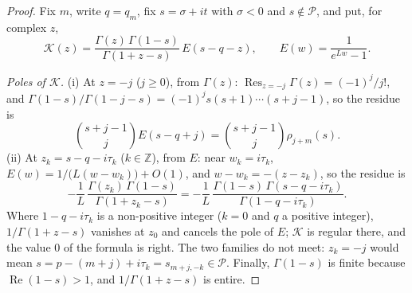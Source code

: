 \documentclass[11pt]{article}
\newcommand{\re}{\operatorname{Re}}
\newcommand{\Res}{\operatorname{Res}}
\begin{document}
\begin{proof}
Fix $m$, write $q=q_m$, fix $s=\sigma+it$ with $\sigma<0$ and $s\notin\mathcal{P}$, and put, for complex $z$,
\[
\mathcal{K}(z)=\frac{\Gamma(z)\,\Gamma(1-s)}{\Gamma(1+z-s)}\,E(s-q-z),\qquad E(w)=\frac{1}{e^{Lw}-1}.
\]

\emph{Poles of $\mathcal{K}$.} (i) At $z=-j$ ($j\ge0$), from $\Gamma(z)$: $\Res_{z=-j}\Gamma(z)=(-1)^j/j!$, and $\Gamma(1-s)/\Gamma(1-j-s)=(-1)^js(s+1)\cdots(s+j-1)$, so the residue is
\[
\binom{s+j-1}{j}E(s-q+j)=\binom{s+j-1}{j}\rho_{j+m}(s).
\]
(ii) At $z_k=s-q-i\tau_k$ ($k\in\mathbb{Z}$), from $E$: near $w_k=i\tau_k$, $E(w)=1/\bigl(L(w-w_k)\bigr)+O(1)$, and $w-w_k=-(z-z_k)$, so the residue is
\[
-\frac1L\,\frac{\Gamma(z_k)\,\Gamma(1-s)}{\Gamma(1+z_k-s)}=-\frac1L\,\frac{\Gamma(1-s)\,\Gamma(s-q-i\tau_k)}{\Gamma(1-q-i\tau_k)}.
\]
Where $1-q-i\tau_k$ is a non-positive integer ($k=0$ and $q$ a positive integer), $1/\Gamma(1+z-s)$ vanishes at $z_0$ and cancels the pole of $E$; $\mathcal{K}$ is regular there, and the value $0$ of the formula is right. The two families do not meet: $z_k=-j$ would mean $s=p-(m+j)+i\tau_k=s_{m+j,-k}\in\mathcal{P}$. Finally, $\Gamma(1-s)$ is finite because $\re(1-s)>1$, and $1/\Gamma(1+z-s)$ is entire.


\end{proof}
\end{document}
